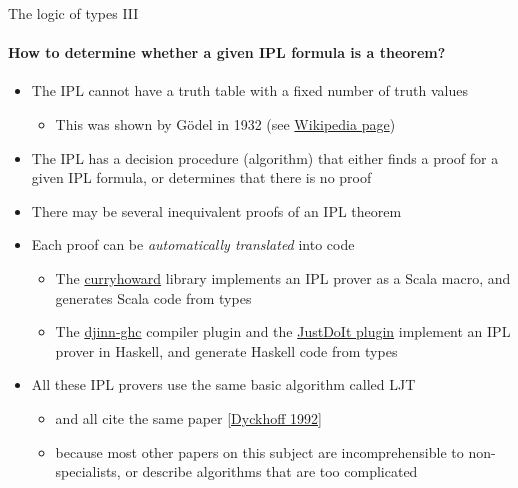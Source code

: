 \documentclass[english]{beamer}
\begin{document}
\begin{frame}{The logic of types III}


\framesubtitle{How to determine whether a given IPL formula is a theorem?}
\begin{itemize}
\item The IPL cannot have a truth table with a fixed number of truth values
\begin{itemize}
\item This was shown by G\"odel in 1932 (see \href{https://en.wikipedia.org/wiki/Many-valued_logic}{Wikipedia page})
\end{itemize}
\item The IPL has a decision procedure (algorithm) that either finds a proof
for a given IPL formula, or determines that there is no proof
\item There may be several inequivalent proofs of an IPL theorem
\item Each proof can be \emph{automatically translated} into code
\begin{itemize}
\item The \href{https://github.com/Chymyst/curryhoward}{curryhoward} library
implements an IPL prover as a Scala macro, and generates Scala code
from types
\item The \href{https://hackage.haskell.org/package/djinn-ghc}{djinn-ghc}
compiler plugin and the \href{https://github.com/nomeata/ghc-justdoit}{JustDoIt plugin}
implement an IPL prover in Haskell, and generate Haskell code from
types
\end{itemize}
\item All these IPL provers use the same basic algorithm called LJT 
\begin{itemize}
\item and all cite the same paper {\footnotesize{}\href{https://rd.host.cs.st-andrews.ac.uk/publications/jsl57.pdf}{[Dyckhoff 1992]}}{\footnotesize \par}
\item because most other papers on this subject are incomprehensible to
non-specialists, or describe algorithms that are too complicated
\end{itemize}
\end{itemize}
\end{frame}
\end{document}
